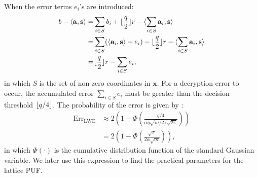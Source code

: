 When the error terms $e_i$'s are introduced:
\begin{align*}
b-\langle\mathbf{a},\mathbf{s}\rangle = &\sum_{i\in S}b_i + \lfloor\frac{q}{2}\rfloor r - \langle\sum_{i\in S}\mathbf{a}_i,\mathbf{s}\rangle\\
= &\sum_{i\in S}(\langle\mathbf{a}_i,\mathbf{s}\rangle+e_i) - \lfloor\frac{q}{2}\rfloor r - \langle\sum_{i\in S}\mathbf{a}_i,\mathbf{s}\rangle\\
= &\lfloor\frac{q}{2}\rfloor r - \sum_{i\in S}e_i,
\end{align*}
in which $S$ is the set of non-zero coordinates in $\mathbf{x}$.
For a decryption error to occur, the accumulated error $\sum_{i\in S}e_i$ must be greater than the decision threshold $\lfloor q/4\rfloor$. 
The probability of the error is given by \cite{micciancio2009lattice}: 
\begin{align*}
\text{Err}_{\text{LWE}} &\approx 2(1-\Phi(\frac{q/4}{\alpha q \sqrt{m/2}/\sqrt{2\pi}})) \\
&= 2(1-\Phi(\frac{\sqrt{\pi}}{2\alpha\sqrt{m}})),
\end{align*}
in which $\Phi(\cdot)$ is the cumulative distribution function of the standard Gaussian variable. 
We later use this expression to find the practical parameters for the lattice PUF.